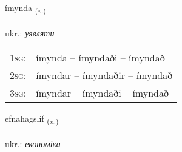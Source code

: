 \documentclass[frontgrid, backgrid]{flacards}\usepackage[]{graphicx}\usepackage[]{xcolor}
\begin{document}
\renewcommand{\flhead}{\vskip5pt \fboxsep=0pt {\small\bfseries\footnotesize Sagnorð | дієслово}}
\renewcommand{\fcfoot}{\vskip5pt \fboxsep=0pt \hspace{2pt}{\small\bfseries\footnotesize 2K}}

\renewcommand{\blhead}{\vskip5pt {\small\bfseries\footnotesize Sagnorð | дієслово }}
\renewcommand{\bcfoot}{\vskip5pt \hspace{2pt}{\small\bfseries\footnotesize 2K}}


{ímynda \small{\textsubscript{(\textit{v.})}} \\[1ex] %
\textphonetic{[iːmɪnta]} \\
ukr.: \emph{уявляти} \\  [2ex]
\renewcommand*{\arraystretch}{0.8}
\begin{tabular}{p{1cm}l}
\textsc{1sg}: & ímynda -- ímyndaði -- ímyndað \\ 
\textsc{2sg}: & ímyndar -- ímyndaðir -- ímyndað \\ 
\textsc{3sg}: & ímyndar -- ímyndaði -- ímyndað \\ 
\end{tabular}
}

\renewcommand{\flhead}{\vskip5pt \fboxsep=0pt {\small\bfseries\footnotesize Nafnorð | іменник}}
\renewcommand{\fcfoot}{\vskip5pt \fboxsep=0pt \hspace{2pt}{\small\bfseries\footnotesize 2K}}

\renewcommand{\blhead}{\vskip5pt {\small\bfseries\footnotesize Nafnorð | іменник }}
\renewcommand{\bcfoot}{\vskip5pt \hspace{2pt}{\small\bfseries\footnotesize 2K}}


{efnahagslíf \small{\textsubscript{(\textit{n.})}} \\[1ex] %
\textphonetic{[ɛpnahaxstliv]} \\
ukr.: \emph{економіка} \\  [2ex]
\renewcommand*{\arraystretch}{0.8}
}
\end{document}

